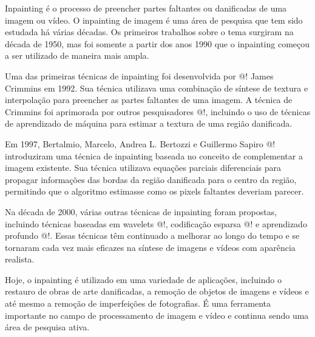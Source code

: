 
Inpainting é o processo de preencher partes faltantes ou danificadas de uma imagem ou vídeo. O inpainting de imagem é uma área de pesquisa que tem sido estudada há várias décadas. Os primeiros trabalhos sobre o tema surgiram na década de 1950, mas foi somente a partir dos anos 1990 que o inpainting começou a ser utilizado de maneira mais ampla.

Uma das primeiras técnicas de inpainting foi desenvolvida por @! James Crimmins em 1992. Sua técnica utilizava uma combinação de síntese de textura e interpolação para preencher as partes faltantes de uma imagem. A técnica de Crimmins foi aprimorada por outros pesquisadores @!, incluindo o uso de técnicas de aprendizado de máquina para estimar a textura de uma região danificada.

Em 1997, Bertalmio, Marcelo, Andrea L. Bertozzi e Guillermo Sapiro @! introduziram uma técnica de inpainting baseada no conceito de complementar a imagem existente. Sua técnica utilizava equações parciais diferenciais para propagar informações das bordas da região danificada para o centro da região, permitindo que o algoritmo estimasse como os pixels faltantes deveriam parecer.

Na década de 2000, várias outras técnicas de inpainting foram propostas, incluindo técnicas baseadas em wavelets @!, codificação esparsa @! e aprendizado profundo @!. Essas técnicas têm continuado a melhorar ao longo do tempo e se tornaram cada vez mais eficazes na síntese de imagens e vídeos com aparência realista.

Hoje, o inpainting é utilizado em uma variedade de aplicações, incluindo o restauro de obras de arte danificadas, a remoção de objetos de imagens e vídeos e até mesmo a remoção de imperfeições de fotografias. É uma ferramenta importante no campo de processamento de imagem e vídeo e continua sendo uma área de pesquisa ativa.